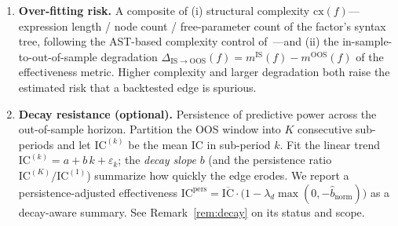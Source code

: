 \documentclass[11pt]{article}
\begin{document}
\begin{enumerate}[leftmargin=1.6em,itemsep=3pt]
\item \textbf{Over-fitting risk.} A composite of (i) structural complexity
      $\mathrm{cx}(f)$---expression length / node count / free-parameter count of the
      factor's syntax tree, following the AST-based complexity control
      of~\cite{tang2025alphaagent}---and (ii) the in-sample-to-out-of-sample
      degradation $\Delta_{\mathrm{IS\to OOS}}(f)=m^{\mathrm{IS}}(f)-m^{\mathrm{OOS}}(f)$
      of the effectiveness metric. Higher complexity and larger degradation both raise
      the estimated risk that a backtested edge is spurious.

\item \textbf{Decay resistance (optional).} Persistence of predictive power across the
      out-of-sample horizon. Partition the OOS window into $K$ consecutive sub-periods
      and let $\mathrm{IC}^{(k)}$ be the mean IC in sub-period $k$. Fit the linear trend
      $\mathrm{IC}^{(k)}=a+b\,k+\varepsilon_k$; the \emph{decay slope} $b$ (and the
      persistence ratio $\mathrm{IC}^{(K)}/\mathrm{IC}^{(1)}$) summarize how quickly the
      edge erodes. We report a persistence-adjusted effectiveness
      $\mathrm{IC}^{\mathrm{pers}}=\overline{\mathrm{IC}}\cdot\big(1-\lambda_d\max(0,-\hat{b}_{\text{norm}})\big)$
      as a decay-aware summary. See Remark~\ref{rem:decay} on its status and scope.
\end{enumerate}
\end{document}
